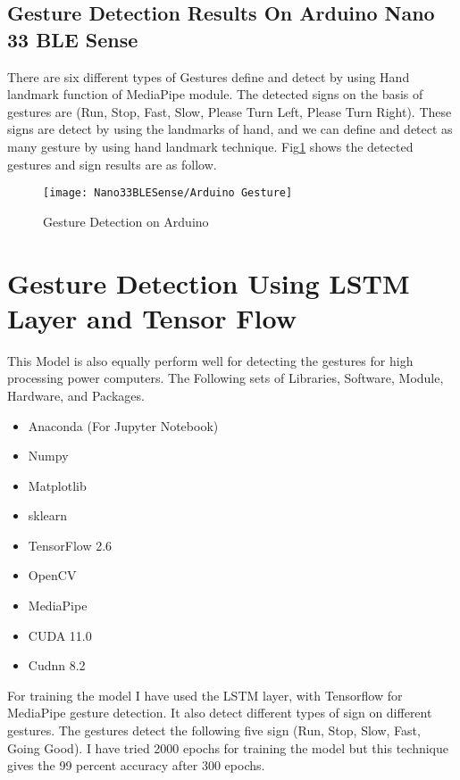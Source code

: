 \subsection{Gesture Detection Results On Arduino Nano 33 BLE Sense}

There are six different types of Gestures define and detect by using Hand landmark function of MediaPipe module. The detected signs on the basis of gestures are (Run, Stop, Fast, Slow, Please Turn Left, Please Turn Right). These signs are detect by using the landmarks of hand, and we can define and detect as many gesture by using hand landmark technique. Fig\ref{Gesture Detection on Arduino} shows the detected gestures and sign results are as follow.

\begin{figure}[h]
	\centering
	\texttt{[image: Nano33BLESense/Arduino Gesture]}
	\caption{Gesture Detection on Arduino}
	\label{Gesture Detection on Arduino}
\end{figure}

\section{Gesture Detection Using LSTM Layer and Tensor Flow}

This Model is also equally perform well for detecting the gestures for high processing power computers. The Following sets of Libraries, Software, Module, Hardware, and Packages.

\begin{itemize}
	\item Anaconda (For Jupyter Notebook)
	\item Numpy
	\item Matplotlib
	\item sklearn
	\item TensorFlow 2.6
	\item OpenCV
	\item MediaPipe
	\item CUDA 11.0 
	\item Cudnn 8.2
\end{itemize}

For training the model  I have used the LSTM layer, with Tensorflow for MediaPipe gesture detection. It also detect different types of sign on different gestures. The gestures detect the following five sign (Run, Stop, Slow, Fast, Going Good). I have tried 2000 epochs for training the model but this technique gives the 99 percent accuracy after 300 epochs.


